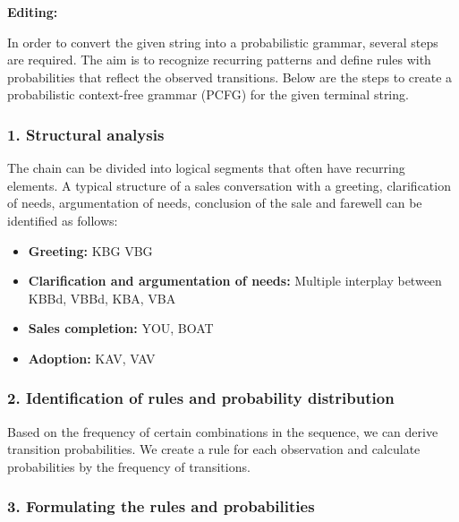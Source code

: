 \documentclass[
]{article}
\begin{document}
\textbf{Editing:}

In order to convert the given string into a probabilistic grammar,
several steps are required. The aim is to recognize recurring patterns
and define rules with probabilities that reflect the observed
transitions. Below are the steps to create a probabilistic context-free
grammar (PCFG) for the given terminal string.

\subsubsection{\texorpdfstring{\textbf{1. Structural
analysis}}{1. Structural analysis}}\label{structural-analysis}

The chain can be divided into logical segments that often have recurring
elements. A typical structure of a sales conversation with a greeting,
clarification of needs, argumentation of needs, conclusion of the sale
and farewell can be identified as follows:

\begin{itemize}
\item
  \textbf{Greeting:} KBG VBG
\item
  \textbf{Clarification and argumentation of needs:} Multiple interplay
  between KBBd, VBBd, KBA, VBA
\item
  \textbf{Sales completion:} YOU, BOAT
\item
  \textbf{Adoption:} KAV, VAV
\end{itemize}

\subsubsection{\texorpdfstring{\textbf{2. Identification of rules and
probability
distribution}}{2. Identification of rules and probability distribution}}\label{identification-of-rules-and-probability-distribution}

Based on the frequency of certain combinations in the sequence, we can
derive transition probabilities. We create a rule for each observation
and calculate probabilities by the frequency of transitions.

\subsubsection{\texorpdfstring{\textbf{3. Formulating the rules and
probabilities}}{3. Formulating the rules and probabilities}}\label{formulating-the-rules-and-probabilities}
\end{document}
